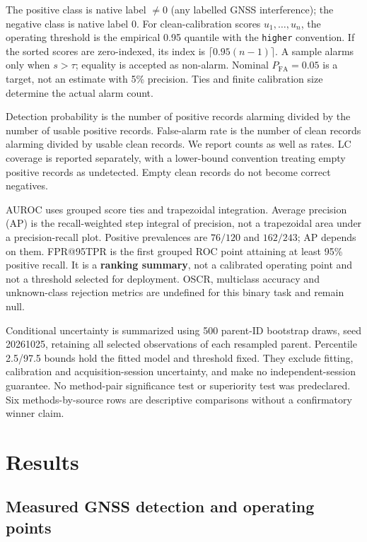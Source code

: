 \documentclass[
  10pt,
]{article}
\begin{document}
The positive class is native label \(\ne0\) (any labelled GNSS
interference); the negative class is native label 0. For
clean-calibration scores \(u_1,\ldots,u_n\), the operating threshold is
the empirical 0.95 quantile with the \texttt{higher} convention. If the
sorted scores are zero-indexed, its index is \(\lceil0.95(n-1)\rceil\).
A sample alarms only when \(s>\tau\); equality is accepted as non-alarm.
Nominal \(P_{\mathrm{FA}}=0.05\) is a target, not an estimate with 5\%
precision. Ties and finite calibration size determine the actual alarm
count.

Detection probability is the number of positive records alarming divided
by the number of usable positive records. False-alarm rate is the number
of clean records alarming divided by usable clean records. We report
counts as well as rates. LC coverage is reported separately, with a
lower-bound convention treating empty positive records as undetected.
Empty clean records do not become correct negatives.

AUROC uses grouped score ties and trapezoidal integration. Average
precision (AP) is the recall-weighted step integral of precision, not a
trapezoidal area under a precision-recall plot. Positive prevalences are
\(76/120\) and \(162/243\); AP depends on them. FPR@95TPR is the first
grouped ROC point attaining at least 95\% positive recall. It is a
\textbf{ranking summary}, not a calibrated operating point and not a
threshold selected for deployment. OSCR, multiclass accuracy and
unknown-class rejection metrics are undefined for this binary task and
remain null.

Conditional uncertainty is summarized using 500 parent-ID bootstrap
draws, seed 20261025, retaining all selected observations of each
resampled parent. Percentile 2.5/97.5 bounds hold the fitted model and
threshold fixed. They exclude fitting, calibration and
acquisition-session uncertainty, and make no independent-session
guarantee. No method-pair significance test or superiority test was
predeclared. Six methods-by-source rows are descriptive comparisons
without a confirmatory winner claim.

\section{Results}\label{results}

\subsection{Measured GNSS detection and operating
points}\label{measured-gnss-detection-and-operating-points}
\end{document}
